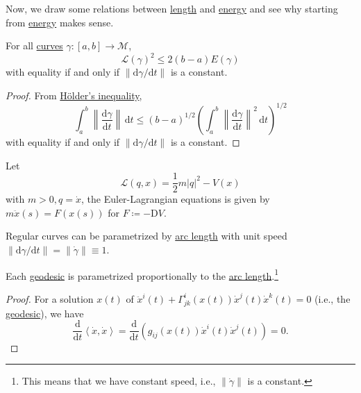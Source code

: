 Now, we draw some relations between \hyperref[def:length]{length} and \hyperref[def:energy]{energy} and see why starting from \hyperref[def:energy]{energy} makes sense.

\begin{proposition}
	For all \hyperref[def:curve]{curves} \(\gamma \colon [a, b] \to \mathcal{M} \),
	\[
		\mathcal{L} (\gamma )^2 \leq 2(b-a) E(\gamma )
	\]
	with equality if and only if \(\lVert \mathrm{d} \gamma / \mathrm{d} t \rVert \) is a constant.
\end{proposition}
\begin{proof}
	From \href{https://en.wikipedia.org/wiki/H%C3%B6lder%27s_inequality}{Hölder's inequality},
	\[
		\int_{a}^{b} \left\lVert \frac{\mathrm{d}\gamma }{\mathrm{d}t} \right\rVert \,\mathrm{d}t
		\leq (b-a)^{1 / 2} \left( \int_{a}^{b} \left\lVert \frac{\mathrm{d}\gamma }{\mathrm{d}t} \right\rVert ^2 \,\mathrm{d}t \right) ^{1 / 2}
	\]
	with equality if and only if \(\lVert \mathrm{d} \gamma / \mathrm{d} t \rVert\) is a constant.
\end{proof}

\begin{eg}
	Let
	\[
		\mathcal{L} (q, x) = \frac{1}{2} m \vert q \vert ^2 - V(x)
	\]
	with \(m > 0, q = \dot{x}\), the Euler-Lagrangian equations is given by \(m\ddot{x} (s) = F(x(s))\) for \(F\coloneqq -\mathrm{D} V\).
\end{eg}

\begin{prev}
	Regular curves can be parametrized by \hyperref[def:length]{arc length} with unit speed \(\lVert \mathrm{d} \gamma / \mathrm{d} t \rVert = \lVert \dot{\gamma } \rVert \equiv 1\).
\end{prev}

\begin{lemma}
	Each \hyperref[def:geodesic]{geodesic} is parametrized proportionally to the \hyperref[def:length]{arc length}.\footnote{This means that we have constant speed, i.e., \(\lVert \dot{\gamma } \rVert \) is a constant.}
\end{lemma}
\begin{proof}
	For a solution \(x(t)\) of \(\ddot{x}^i(t) + \Gamma ^{i}_{jk}(x(t)) \dot{x}^j(t)\dot{x}^k(t) = 0\) (i.e., the \hyperref[def:geodesic]{geodesic}), we have
	\[
		\frac{\mathrm{d}}{\mathrm{d}t} \left\langle \dot{x}, \dot{x} \right\rangle
		= \frac{\mathrm{d}}{\mathrm{d}t} \left( g_{ij} (x(t)) \dot{x}^i(t)\dot{x}^j(t)\right)
		=0.
	\]
\end{proof}

